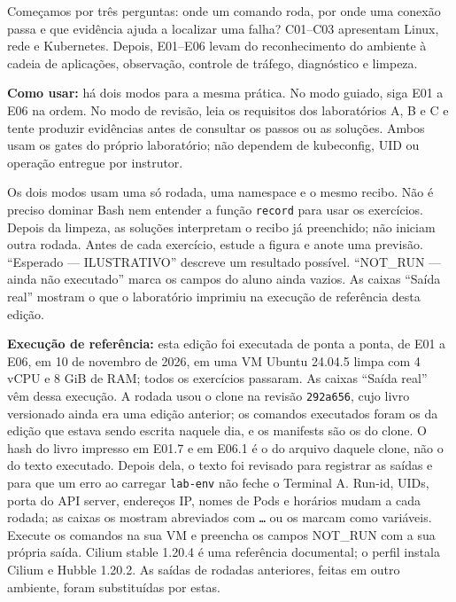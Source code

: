 \documentclass[12pt,openany,oneside,a4paper,chapter=TITLE,english,brazil]{abntex2}
\begin{document}
\renewcommand{\listfigurename}{Lista de figuras}
\frenchspacing

\imprimircapa
\imprimirfolhaderosto

Começamos por três perguntas: onde um comando roda, por onde uma conexão passa e que evidência ajuda a localizar uma falha? C01--C03 apresentam Linux, rede e Kubernetes. Depois, E01--E06 levam do reconhecimento do ambiente à cadeia de aplicações, observação, controle de tráfego, diagnóstico e limpeza.

\textbf{Como usar:} há dois modos para a mesma prática. No modo guiado, siga E01 a E06 na ordem. No modo de revisão, leia os requisitos dos laboratórios A, B e C e tente produzir evidências antes de consultar os passos ou as soluções. Ambos usam os gates do próprio laboratório; não dependem de kubeconfig, UID ou operação entregue por instrutor.

Os dois modos usam uma só rodada, uma namespace e o mesmo recibo. Não é preciso dominar Bash nem entender a função \texttt{record} para usar os exercícios. Depois da limpeza, as soluções interpretam o recibo já preenchido; não iniciam outra rodada. Antes de cada exercício, estude a figura e anote uma previsão. ``Esperado --- ILUSTRATIVO'' descreve um resultado possível. ``NOT\_RUN --- ainda não executado'' marca os campos do aluno ainda vazios. As caixas ``Saída real'' mostram o que o laboratório imprimiu na execução de referência desta edição.

\textbf{Execução de referência:} esta edição foi executada de ponta a ponta, de E01 a E06, em 10 de novembro de 2026, em uma VM Ubuntu 24.04.5 limpa com 4 vCPU e 8 GiB de RAM; todos os exercícios passaram. As caixas ``Saída real'' vêm dessa execução. A rodada usou o clone na revisão \texttt{292a656}, cujo livro versionado ainda era uma edição anterior; os comandos executados foram os da edição que estava sendo escrita naquele dia, e os manifests são os do clone. O hash do livro impresso em E01.7 e em E06.1 é o do arquivo daquele clone, não o do texto executado. Depois dela, o texto foi revisado para registrar as saídas e para que um erro ao carregar \texttt{lab-{}\allowbreak{}env} não feche o Terminal A. Run-id, UIDs, porta do API server, endereços IP, nomes de Pods e horários mudam a cada rodada; as caixas os mostram abreviados com \texttt{…} ou os marcam como variáveis. Execute os comandos na sua VM e preencha os campos NOT\_RUN com a sua própria saída. Cilium stable 1.20.4 é uma referência documental; o perfil instala Cilium e Hubble 1.20.2. As saídas de rodadas anteriores, feitas em outro ambiente, foram substituídas por estas.
\end{document}
